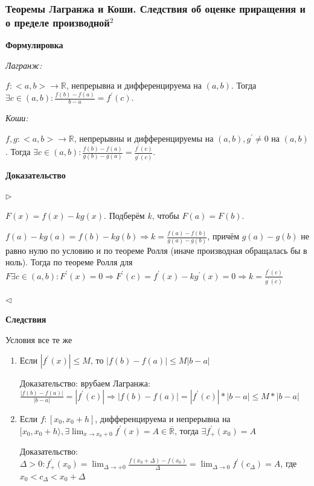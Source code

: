 \documentclass{article}
\begin{document}
\subsubsection{Теоремы Лагранжа и Коши. Следствия об оценке приращения и о пределе производной\texorpdfstring{$^2$}{}}

\textbf{Формулировка}

\textit{Лагранж:}

$f: <a, b> \rightarrow \mathbb{R}$, непрерывна и дифференцируема на $(a, b)$. Тогда $\exists c \in (a, b): \frac{f(b) - f(a)}{b - a}=f^\prime(c)$.

\textit{Коши:}

$f, g: <a, b> \rightarrow \mathbb{R}$, непрерывны и дифференцируемы на $(a, b), g^\prime \neq 0$ на $(a, b)$. Тогда $\exists c \in (a, b): \frac{f(b) - f(a)}{g(b) - g(a)}=\frac{f^\prime(c)}{g^\prime(c)}$.

\textbf{Доказательство}

$\rhd$

$F(x) = f(x) - kg(x)$. Подберём $k$, чтобы $F(a) = F(b)$.

$f(a) - kg(a) = f(b) - kg(b) \Rightarrow k = \frac{f(a) - f(b)}{g(a) - g(b)}$, причём $g(a) - g(b)$ не равно нулю по условию и по теореме Ролля (иначе производная обращалась бы в ноль). Тогда по теореме Ролля для $F \exists c \in (a, b): F^\prime(x) = 0 \Rightarrow F^\prime(c) = f^\prime(x) - kg^\prime(x) = 0 \Rightarrow k = \frac{f^\prime(c)}{g^\prime(c)}$

$\lhd$

\textbf{Следствия}

Условия все те же

\begin{enumerate}
    \item Если $|f^\prime(x)| \le M$, то $|f(b) - f(a)| \le M|b - a|$
    
    Доказательство: врубаем Лагранжа: $\frac{|f(b) - f(a)|}{|b - a|} = |f^\prime(c)| \Rightarrow |f(b) - f(a)| = |f^\prime(c)| * |b - a| \le M * |b - a|$
    \item Если $f: [x_0, x_0 + h]$, дифференцируема и непрерывна на $[x_0, x_0 + h \rangle, \exists \lim_{x \rightarrow x_0 + 0}{f^\prime(x)} = A \in \overline{\mathbb{R}}$, тогда $\exists f^\prime_+(x_0) = A$
    
    Доказательство: $\Delta > 0 : f^\prime_+(x_0) = \lim_{\Delta \rightarrow + 0}{\frac{f(x_0 + \Delta) - f(x_0)}{\Delta}} = \lim_{\Delta \rightarrow 0}{f^\prime(c_\Delta)} = A$, где $x_0 < c_\Delta < x_0 + \Delta$
\end{enumerate}
\newpage
\end{document}
